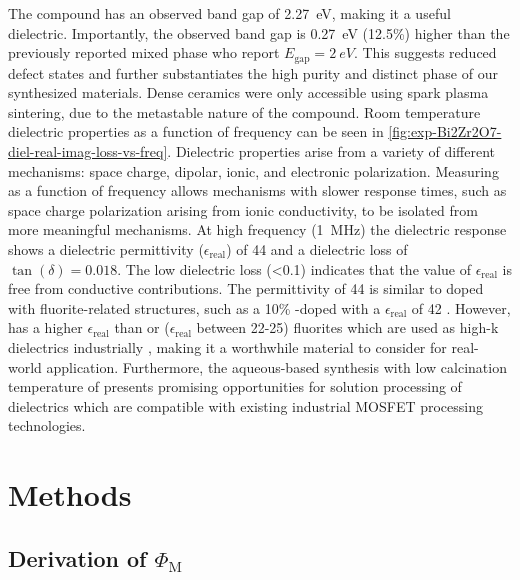 \documentclass{article}
\newcommand{\fom}[1][]{\Phi_\text{M#1}}
\newcommand{\BiZrO}[1][]{\ch{Bi2Zr2O7#1}}
\newcommand{\egap}{{E_\text{gap}}}
\newcommand{\epsreal}{\epsilon_\text{real}}
\newcommand{\dielloss}{\tan(\delta)}
\begin{document}
The \BiZrO{} compound has an observed band gap of \SI{2.27}{eV}, making it a useful dielectric.
Importantly, the observed band gap is \SI{0.27}{eV} (12.5\%) higher than the previously reported mixed phase \cite{pandey_metastable_2018} who report $\egap = \SI{2}{eV}$.
This suggests reduced defect states and further substantiates the high purity and distinct phase of our synthesized materials.
Dense ceramics were only accessible using spark plasma sintering, due to the metastable nature of the compound.
Room temperature dielectric properties as a function of frequency can be seen in \cref{fig:exp-Bi2Zr2O7-diel-real-imag-loss-vs-freq}.
Dielectric properties arise from a variety of different mechanisms: space charge, dipolar, ionic, and electronic polarization.
Measuring as a function of frequency allows mechanisms with slower response times, such as space charge polarization arising from ionic conductivity, to be isolated from more meaningful mechanisms.
At high frequency (\SI{1}{MHz}) the dielectric response shows a dielectric permittivity ($\epsreal$) of 44 and a dielectric loss of $\dielloss = 0.018$.
The low dielectric loss (\textless 0.1) indicates that the value of $\epsreal$ is free from conductive contributions.
The permittivity of 44 is similar to doped  with fluorite-related structures, such as a 10\% -doped  with a $\epsreal$ of 42 \cite{valant_dielectric_2004}.
However, \BiZrO{} has a higher $\epsreal$ than  or  ($\epsreal$ between 22-25) fluorites which are used as high-k dielectrics industrially \cite{choi_development_2011}, making it a worthwhile material to consider for real-world application.
Furthermore, the aqueous-based synthesis with low calcination temperature of \BiZrO{} presents promising opportunities for solution processing of dielectrics which are compatible with existing industrial MOSFET processing technologies.


\clearpage
\section{Methods}

\subsection{Derivation of \texorpdfstring{$\fom$}{FoM}}
\label{sec:choosing-fom}
\end{document}
